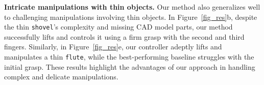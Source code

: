 \noindent\textbf{Intricate manipulations with thin objects. } 
Our method also generalizes well to challenging manipulations involving thin objects. In Figure~\ref{fig_res}b, despite the thin \texttt{shovel}'s complexity and missing CAD model parts, our method successfully lifts and controls it using a firm grasp with the second and third fingers. Similarly, in Figure~\ref{fig_res}e, our controller adeptly lifts and manipulates a thin \texttt{flute}, while the best-performing baseline struggles with the initial grasp. These results highlight the advantages of our approach in handling complex and delicate manipulations.

